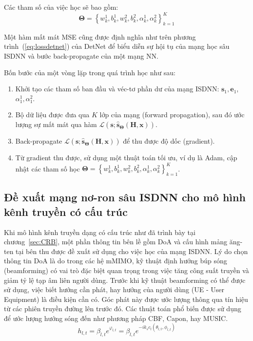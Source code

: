 Các tham số của việc học sẽ bao gồm:
\begin{equation}
\boldsymbol{\Theta}=\left\{w^1_{k}, b^1_{k}, w^2_{k}, b^2_{k}, \alpha^1_k, \alpha^2_k \right\}_{k=1}^K
\end{equation}

Một hàm mất mát MSE cũng được định nghĩa như trên phương trình~(\ref{eq:lossdetnet}) của DetNet để biểu diễn sự hội tụ của mạng học sâu ISDNN và bước back-propagate của một mạng NN.

Bốn bước của một vòng lặp trong quá trình học như sau:
\begin{enumerate}
    \item Khởi tạo các tham số ban đầu và véc-tơ phần dư của mạng ISDNN: $\mathbf{s}_1, \mathbf{e}_1$, $\alpha^1_1, \alpha^2_1$.

    \item Bộ dữ liệu được đưa qua $K$ lớp của mạng (forward propagation), sau đó ước lượng sự mất mát qua hàm $\mathcal{L}(\mathbf{s}; \hat{\mathbf{s}}_{\boldsymbol{\Theta}}(\mathbf{H}, \mathbf{x}))$.

    \item Back-propagate $\mathcal{L}(\mathbf{s}; \hat{\mathbf{s}}_{\boldsymbol{\Theta}}(\mathbf{H}, \mathbf{x}))$ để thu được độ dốc (gradient).

    \item Từ gradient thu được, sử dụng một thuật toán tối ưu, ví dụ là Adam, cập nhật các tham số học $\boldsymbol{\Theta}=\left\{w^1_{k}, b^1_{k}, w^2_{k}, b^2_{k}, \alpha^1_k, \alpha^2_k \right\}_{k=1}^K$.
\end{enumerate}

\subsection{Đề xuất mạng nơ-ron sâu ISDNN cho mô hình kênh truyền có cấu trúc}

Khi mô hình kênh truyền dạng có cấu trúc như đã trình bày tại chương~\ref{sec:CRB}, một phần thông tin bên lề gồm DoA và cấu hình mảng ăng-ten tại bên thu được đề xuất sử dụng cho việc học của mạng ISDNN. Lý do chọn thông tin DoA là do trong các hệ mMIMO, kỹ thuật định hướng búp sóng (beamforming) có vai trò đặc biệt quan trọng trong việc tăng công suất truyền và giảm tỷ lệ tạp âm liên người dùng. Trước khi kỹ thuật beamforming có thể được sử dụng, việc biết hướng cần phát, hay hướng của người dùng (UE - User Equipment) là điều kiện cần có. Góc phát này được ước lượng thông qua tín hiệu từ các phiên truyền đường lên trước đó. Các thuật toán phổ biến được sử dụng để ước lượng hướng sóng đến như phương pháp CBF, Capon, hay MUSIC. 
\begin{equation}
    \label{eq:28}
    h_{l, t} = \beta_{l, t} e^{\varphi_{l, t}} = \beta_{l, t} e^{-i k_s c_l (\theta_{l, t}, \phi_{l, t})}
\end{equation}

